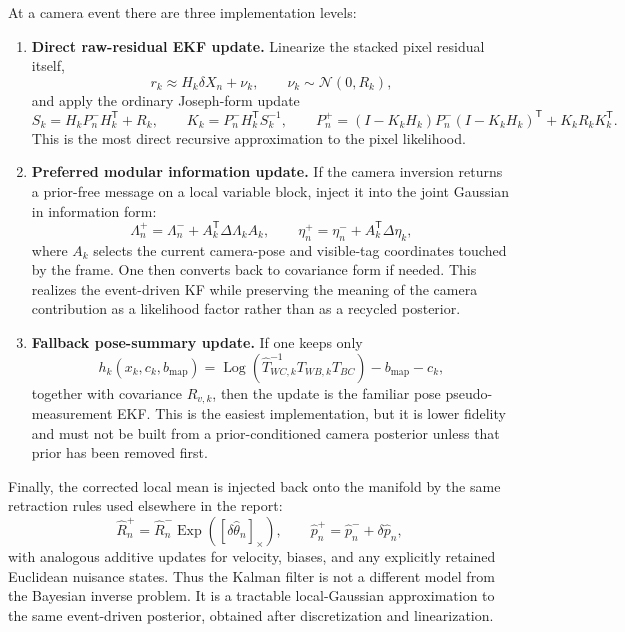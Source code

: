 \documentclass[11pt]{report}
\newcommand{\Exp}{\operatorname{Exp}}
\newcommand{\Log}{\operatorname{Log}}
\newcommand{\Normal}{\mathcal{N}}
\newcommand{\tran}{^{\mathsf T}}
\begin{document}
At a camera event there are three implementation levels:
\begin{enumerate}
  \item \textbf{Direct raw-residual EKF update.} Linearize the stacked pixel residual itself,
  \[
  r_k \approx H_k\delta X_n+\nu_k,
  \qquad
  \nu_k\sim \Normal(0,R_k),
  \]
  and apply the ordinary Joseph-form update
  \begin{equation}
  S_k=H_kP_n^-H_k\tran+R_k,
  \qquad
  K_k=P_n^-H_k\tran S_k^{-1},
  \qquad
  P_n^+=(I-K_kH_k)P_n^-(I-K_kH_k)\tran+K_kR_kK_k\tran.
  \label{eq:joseph_update_sweep}
  \end{equation}
  This is the most direct recursive approximation to the pixel likelihood.
  \item \textbf{Preferred modular information update.} If the camera inversion returns a prior-free message on a local variable block, inject it into the joint Gaussian in information form:
  \begin{equation}
  \Lambda_n^+=\Lambda_n^-+A_k\tran\Delta\Lambda_kA_k,
  \qquad
  \eta_n^+=\eta_n^-+A_k\tran\Delta\eta_k,
  \label{eq:information_message_injection}
  \end{equation}
  where $A_k$ selects the current camera-pose and visible-tag coordinates touched by the frame. One then converts back to covariance form if needed. This realizes the event-driven KF while preserving the meaning of the camera contribution as a likelihood factor rather than as a recycled posterior.
  \item \textbf{Fallback pose-summary update.} If one keeps only
  \begin{equation}
  h_k(x_k,c_k,b_{\mathrm{map}})
  =\Log\!\left(\widehat T_{WC,k}^{-1}T_{WB,k}T_{BC}\right)-b_{\mathrm{map}}-c_k,
  \label{eq:visual_residual_filter_sweep}
  \end{equation}
  together with covariance $R_{v,k}$, then the update is the familiar pose pseudo-measurement EKF. This is the easiest implementation, but it is lower fidelity and must not be built from a prior-conditioned camera posterior unless that prior has been removed first.
\end{enumerate}

Finally, the corrected local mean is injected back onto the manifold by the same retraction rules used elsewhere in the report:
\[
\hat R_n^+=\hat R_n^-\Exp([\delta\hat\theta_n]_{\times}),
\qquad
\hat p_n^+=\hat p_n^-+\delta\hat p_n,
\]
with analogous additive updates for velocity, biases, and any explicitly retained Euclidean nuisance states. Thus the Kalman filter is not a different model from the Bayesian inverse problem. It is a tractable local-Gaussian approximation to the same event-driven posterior, obtained after discretization and linearization.
\end{document}
